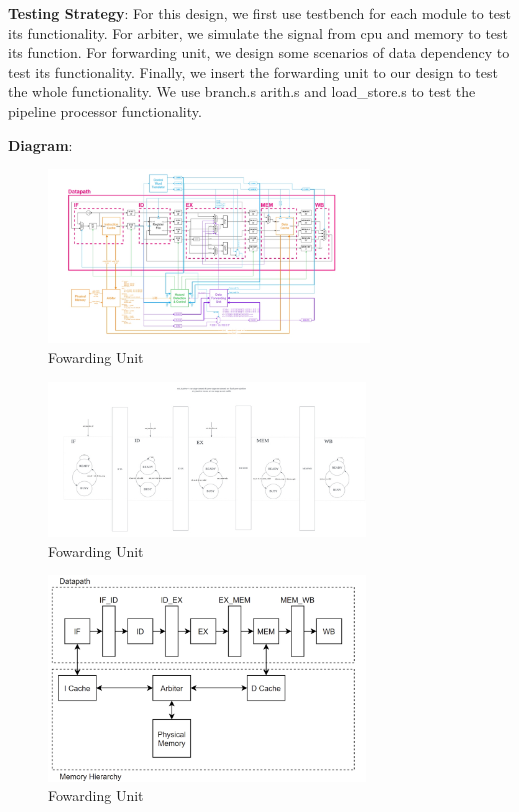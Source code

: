 \documentclass[12pt, a4paper]{article}
\begin{document}
    \textbf{Testing Strategy}: For this design, we first use testbench for each module to test its functionality. For arbiter, we simulate the signal from cpu and memory to test its function. For forwarding unit, we design some scenarios of data dependency to test its functionality. Finally, we insert the forwarding unit to our design to test the whole functionality. We use branch.s arith.s and load\_store.s to test the pipeline processor functionality. 

    \textbf{Diagram}:

    \begin{figure}[H]
        \centering
        \includegraphics[width=0.76\textwidth]{forwarding_unit.png}
        \caption{Fowarding Unit}
        \label{fig:enter-label}
    \end{figure}

    
    \begin{figure}[H]
        \centering
        \includegraphics[width=0.75\textwidth]{hazard_control.png}
        \caption{Fowarding Unit}
        \label{fig:enter-label}
    \end{figure}


    \begin{figure}[H]
        \centering
        \includegraphics[width=0.75\textwidth]{arbiter.png}
        \caption{Fowarding Unit}
        \label{fig:enter-label}
    \end{figure}
    
\end{document}
